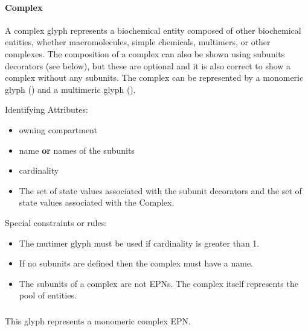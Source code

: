 

\paragraph{Complex}\label{sec:complex}

A complex glyph represents a biochemical entity composed of other
biochemical entities, whether macromolecules, simple chemicals,
multimers, or other complexes. The composition of a complex can also
be shown using subunits decorators (see below), but these are optional
and it is also correct to show a complex without any subunits. The
complex can be represented by a monomeric glyph () and a multimeric glyph ().

\begin{glyphDescription}
\item[Identifying Attributes:]\mbox{}
  \begin{itemize}
  \item owning compartment
  \item name \textbf{or} names of the subunits 
  \item cardinality
  \item The set of state values associated with the subunit decorators
    and the set of state values associated with the Complex.
 \end{itemize}
\item[Special constraints or rules:]\mbox{}
\begin{itemize}
  \item The mutimer glyph must be used if cardinality is greater than
    1.
  \item If no subunits are defined then the complex must have a name.
  \item The subunits of a complex are not EPNs. The complex itself
    represents the pool of entities.
\end{itemize}
\end{glyphDescription}


\subparagraph{}

This glyph represents a monomeric complex EPN.

